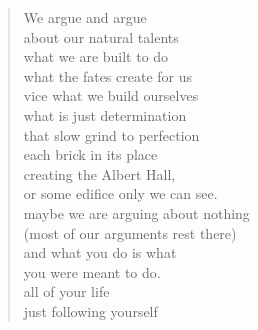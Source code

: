 \begin{verse}
We argue and argue \\
about our natural talents  \\
what we are built to do  \\
what the fates create for us \\
vice what we build ourselves \\
what is just determination \\
that slow grind to perfection \\
each brick in its place \\
creating the Albert Hall, \\
or some edifice only we can see. \\
maybe we are arguing about nothing \\
(most of our arguments rest there) \\
and what you do is what  \\
you were meant to do. \\
all of your life  \\
just following yourself
\end{verse}
